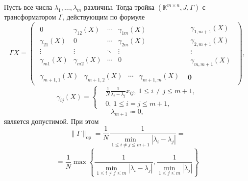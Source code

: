 \begin{ksvlem}
    Пусть все числа \( \lambda_1, \ldots, \lambda_m \) различны.
    Тогда тройка \( (\mathbb{K}^{m{\times}n}, J, \Gamma) \)
    с трансформатором \( \Gamma \), действующим по формуле
    \[
        \Gamma X =
        \left(\begin{array}{c|c}
            \begin{matrix}
                0               & \gamma_{12}(X) & \cdots & \gamma_{1m}(X) \\
                \gamma_{21}(X)  & 0              & \cdots & \gamma_{2m}(X) \\
                \vdots          & \vdots         & \ddots & \vdots & \ \\
                \gamma_{m1}(X)  & \gamma_{m2}(X) & \cdots & 0
            \end{matrix} &
            \begin{matrix}
                \gamma_{1,m+1}(X) \\
                \gamma_{2,m+1}(X) \\
                \vdots \\
                \gamma_{m,m+1}(X)
            \end{matrix} \\ \hline
            \begin{matrix}
                \gamma_{m{+}1,1}(X) &
                \gamma_{m{+}1,2}(X) &
                \cdots &
                \gamma_{m{+}1,m}(X)
            \end{matrix} &
            \mathbf{0}
        \end{array}\right),
        \]
    \[
        \gamma_{ij}(X) =
        \left\{\begin{aligned}
            & \frac1N \frac{1}{\lambda_i - \lambda_j} x_{ij},
              \ 1\leq i{\neq}j \leq m{+}1, \\
            & 0,
              \ 1\leq i{=}j \leq m{+}1,
        \end{aligned}\right.
        \]
    \[
        \lambda_{m+1} \coloneqq 0,
        \]
    является допустимой.
    При этом
    \[
        \|\Gamma\|_{\mathrm{op}} =
        \frac1N
        \frac{1}{\min_{1\leq i{\neq}j \leq m{+}1}|\lambda_i - \lambda_j|} =
        \]
    \[
        = \frac1N
         \max\left\{
         \frac{1}{
             \min\limits_{1\leq i{\neq}j \leq m }{|\lambda_i - \lambda_j|}},
         \frac{1}{
             \min\limits_{1\leq j \leq m}{|\lambda_j|}}
         \right\}
        \]
\end{ksvlem}

